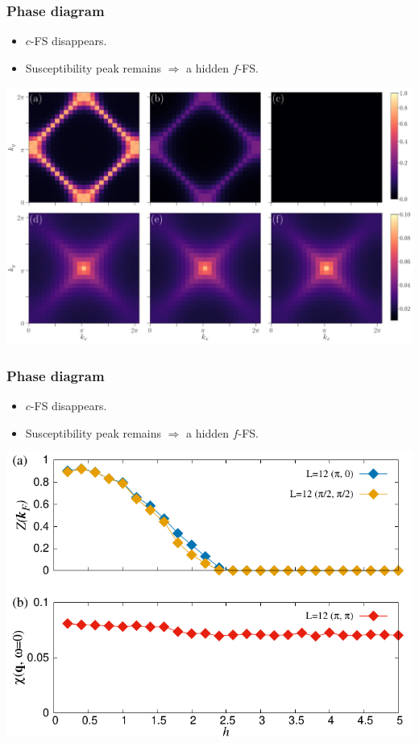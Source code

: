 \documentclass[xcolor=table, 10pt, aspectratio=43]{beamer}
\begin{document}
\begin{frame}
\frametitle{Phase diagram}
\begin{itemize}
\item $c$-FS disappears.
\item Susceptibility peak remains $\Rightarrow$ a hidden $f$-FS.
\end{itemize}
\begin{center}
	\includegraphics[width=\textwidth]{../orthogonal_metal/fig2}
\end{center}
\end{frame}

\begin{frame}
\frametitle{Phase diagram}
\begin{itemize}
\item $c$-FS disappears.
\item Susceptibility peak remains $\Rightarrow$ a hidden $f$-FS.
\end{itemize}
\begin{center}
	\includegraphics[width=.8\textwidth]{../orthogonal_metal/fig4}
\end{center}
\end{frame}
\end{document}
